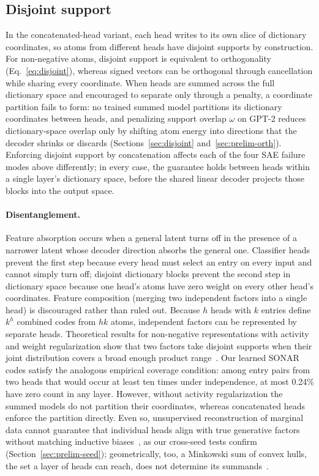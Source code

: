 \subsection{Disjoint support}
\label{sec:bg-disjoint}
In the concatenated-head variant, each head writes to its own slice of
dictionary coordinates, so atoms from different heads have disjoint
supports by construction. For non-negative atoms, disjoint support is
equivalent to orthogonality (Eq.~\eqref{eq:disjoint}), whereas signed
vectors can be orthogonal through cancellation while sharing every
coordinate. When heads are summed across the full dictionary space and
encouraged to separate only through a penalty, a coordinate partition
fails to form: no trained summed model partitions its dictionary
coordinates between heads, and penalizing support overlap $\omega$ on
GPT-2 reduces dictionary-space overlap only by shifting atom energy into
directions that the decoder shrinks or discards
(Sections~\ref{sec:disjoint} and~\ref{sec:prelim-orth}). Enforcing
disjoint support by concatenation affects each of the four SAE failure
modes above differently; in every case, the guarantee holds between
heads within a single layer's dictionary space, before the shared linear
decoder projects those blocks into the output space.

\paragraph{Disentanglement.}
Feature absorption occurs when a general latent turns off in the
presence of a narrower latent whose decoder direction absorbs the
general one. Classifier heads prevent the first step because every head
must select an entry on every input and cannot simply turn off; disjoint
dictionary blocks prevent the second step in dictionary space because one
head's atoms have zero weight on every other head's coordinates. Feature
composition (merging two independent factors into a single head) is
discouraged rather than ruled out. Because $h$ heads with $k$ entries
define $k^h$ combined codes from $hk$ atoms, independent factors can be
represented by separate heads. Theoretical results for non-negative
representations with activity and weight regularization show that two
factors take disjoint supports when their joint distribution covers a
broad enough product range~\cite{whittington2023,dorrell2025}. Our
learned SONAR codes satisfy the analogous empirical coverage condition:
among entry pairs from two heads that would occur at least ten times
under independence, at most 0.24\% have zero count in any layer. However,
without activity regularization the summed models do not partition their
coordinates, whereas concatenated heads enforce the partition directly.
Even so, unsupervised reconstruction of marginal data cannot guarantee
that individual heads align with true generative factors without
matching inductive biases~\cite{locatello2019}, as our cross-seed tests
confirm (Section~\ref{sec:prelim-seed}); geometrically, too, a Minkowski
sum of convex hulls, the set a layer of heads can reach, does not
determine its summands~\cite{fel2026rabbit}.

